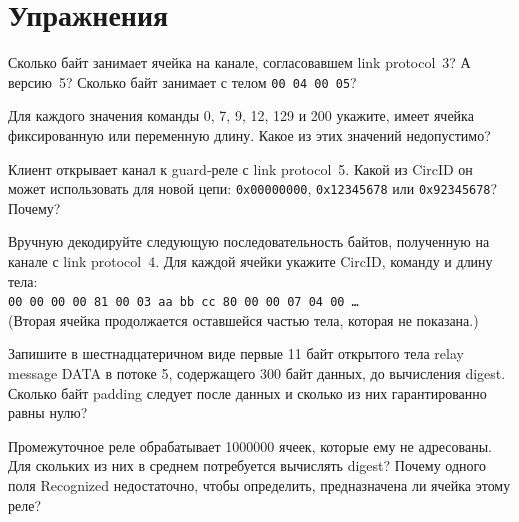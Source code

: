 \section*{Упражнения}

\begin{esercizio}[1]\label{es:08-lunghezze}
Сколько байт занимает ячейка  на канале, согласовавшем link protocol~3? А версию~5? Сколько байт занимает  с телом \texttt{00 04 00 05}?
\end{esercizio}

\begin{esercizio}[1]\label{es:08-formato}
Для каждого значения команды 0, 7, 9, 12, 129 и 200 укажите, имеет ячейка фиксированную или переменную длину. Какое из этих значений недопустимо?
\end{esercizio}

\begin{esercizio}[1]\label{es:08-circid}
Клиент открывает канал к guard-реле с link protocol~5. Какой из CircID он может использовать для новой цепи: \texttt{0x00000000}, \texttt{0x12345678} или \texttt{0x92345678}? Почему?
\end{esercizio}

\begin{esercizio}[2]\label{es:08-hex}
Вручную декодируйте следующую последовательность байтов, полученную на канале с link protocol~4. Для каждой ячейки укажите CircID, команду и длину тела:\\
\texttt{00 00 00 00 81 00 03 aa bb cc 80 00 00 07 04 00 \ldots}\\
(Вторая ячейка продолжается оставшейся частью тела, которая не показана.)
\end{esercizio}

\begin{esercizio}[2]\label{es:08-relay}
Запишите в шестнадцатеричном виде первые 11 байт открытого тела relay message DATA в потоке 5, содержащего 300 байт данных, до вычисления digest. Сколько байт padding следует после данных и сколько из них гарантированно равны нулю?
\end{esercizio}

\begin{esercizio}[2]\label{es:08-recognized}
Промежуточное реле обрабатывает \num{1000000} ячеек, которые ему не адресованы. Для скольких из них в среднем потребуется вычислять digest? Почему одного поля Recognized недостаточно, чтобы определить, предназначена ли ячейка этому реле?
\end{esercizio}

